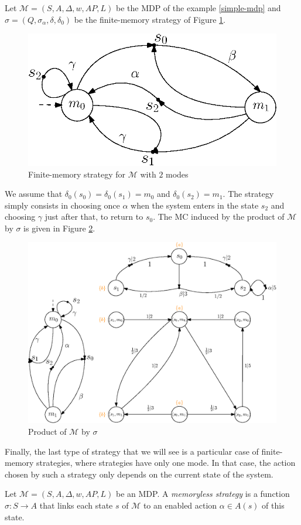 \begin{example}
  Let $\mathcal{M}=(S, A, \Delta, w, AP, L)$ be the MDP of the example \ref{simple-mdp} and $\sigma = (Q, \sigma_\alpha, \delta, \delta_0)$ be the
  finite-memory strategy of Figure \ref{finite_mem_strat}.
  \begin{figure}[h!]
    \centering
    \includegraphics[width=0.4\linewidth]{resources/strategy}
    \caption{Finite-memory strategy for $\mathcal{M}$ with $2$ modes}\label{finite_mem_strat}
  \end{figure}

  We assume that $\delta_0(s_0) = \delta_0(s_1) = m_0$ and $\delta_0(s_2) = m_1$.
  The strategy simply consists in choosing once $\alpha$ when the system enters in the state $s_2$ and choosing $\gamma$ just after that, to return to $s_0$. The MC induced by the product of $\mathcal{M}$ by $\sigma$ is given in Figure
  \ref{inducedMC}.
  \begin{figure}[H]
    \centering
    \includegraphics[width=0.55\linewidth]{resources/inductedmarkov}
    \caption{Product of $\mathcal{M}$ by $\sigma$}\label{inducedMC}
  \end{figure}
\end{example}

Finally, the last type of strategy that we will see is a particular case of finite-memory strategies, where strategies have only one mode.
In that case, the action chosen by such a strategy only depends on the current state of the system.

\begin{definition}
  Let $\mathcal{M}=(S, A, \Delta, w, AP, L)$ be an MDP. A \textit{memoryless strategy} is a function
  $
    \sigma: S \rightarrow A
  $ that links each state $s$ of $\mathcal{M}$ to an enabled action $\alpha \in A(s)$ of this state.
\end{definition}

